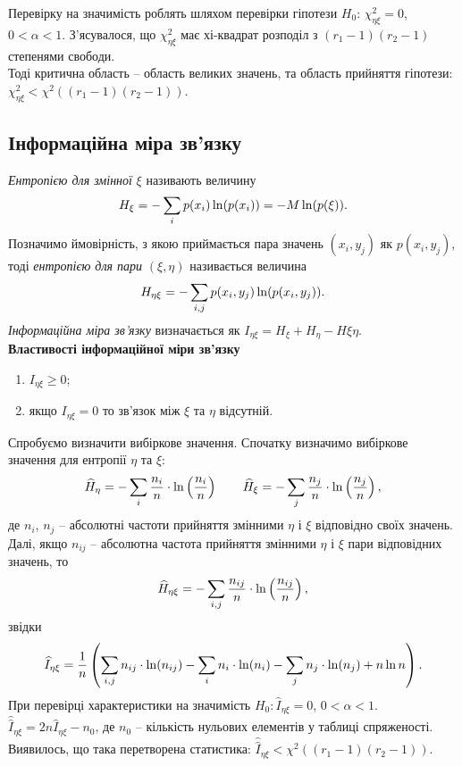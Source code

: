 Перевірку на значимість роблять шляхом перевірки гіпотези $H_0$: $\chi_{\eta\xi}^2=0$, $0<\alpha<1$. З'ясувалося, що $\chi_{\eta\xi}^2$ має хі-квадрат розподіл з $(r_1-1)(r_2-1)$ степенями свободи. \\

Тоді критична область -- область великих значень, та область прийняття гіпотези:
$\chi_{\eta\xi}^2 < \chi^2((r_1-1)(r_2-1))$.
\subsection{Інформаційна міра зв'язку}
\textit{Ентропією для змінної} $\xi$ називають величину \[H_\xi = - \displaystyle\sum\limits_i p(x_i) \ln (p(x_i)) = - M \ln (p(\xi)). \]
Позначимо ймовірність, з якою приймається пара значень $(x_i, y_j)$ як $p(x_i, y_j)$, тоді \textit{ентропією для пари} $(\xi, \eta)$ називається величина \[H_{\eta\xi} = - \displaystyle\sum\limits_{i,j} p(x_i, y_j) \ln (p(x_i, y_j)).\]
\textit{Інформаційна міра зв'язку} визначається як $I_{\eta\xi} = H_{\xi} + H_{\eta} - H{\xi\eta}$. \\

\textbf{Властивості інформаційної міри зв'язку}
\begin{enumerate}
	\item $I_{\eta\xi} \ge 0$;
	\item якщо $I_{\eta\xi} = 0$ то зв'язок між $\xi$ та $\eta$ відсутній.
\end{enumerate}
Спробуємо визначити вибіркове значення. Спочатку визначимо вибіркове значення для ентропії $\eta$ та $\xi$: \[ \widehat{H}_\eta = - \displaystyle\sum\limits_i \dfrac{n_i}{n} \cdot \ln \left(\dfrac{n_i}{n}\right) \qquad \widehat{H}_\xi = - \displaystyle\sum\limits_j \dfrac{n_j}{n} \cdot \ln \left(\dfrac{n_j}{n}\right), \] де $n_i$, $n_j$ -- абсолютні частоти прийняття змінними $\eta$ і $\xi$ відповідно своїх значень. Далі, якщо $n_{ij}$ -- абсолютна частота прийняття змінними $\eta$ і $\xi$ пари відповідних значень, то
\[\widehat{H}_{\eta\xi} = - \displaystyle\sum\limits_{i,j} \dfrac{n_{ij}}{n} \cdot \ln \left(\dfrac{n_{ij}}{n}\right),\] звідки \[ \widehat{I}_{\eta\xi} = \dfrac{1}{n} \left(\displaystyle\sum\limits_{i,j} n_{ij} \cdot \ln (n_{ij}) - \displaystyle\sum\limits_i n_i \cdot \ln (n_i) - \displaystyle\sum\limits_j n_j \cdot \ln (n_j) + n \ln n\right). \]
При перевірці характеристики на значимість $H_0: \widehat{I}_{\eta\xi}=0$, $0<\alpha<1$. $\widehat{\widehat{I}}_{\eta\xi} = 2n\widehat{I}_{\eta\xi} - n_0$, де $n_0$ -- кількість нульових елементів у таблиці спряженості. \\

Виявилось, що така перетворена статистика: $\widehat{\widehat{I}}_{\eta\xi} < \chi^2((r_1-1)(r_2-1))$. \\

